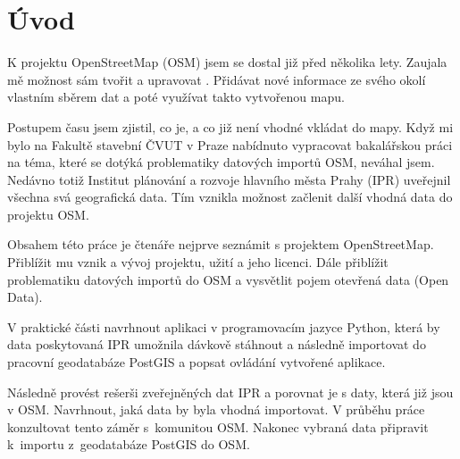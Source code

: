 \chapter{Úvod}
\label{1-uvod}

K projektu OpenStreetMap (OSM) jsem se dostal již před několika lety.
Zaujala mě možnost sám tvořit a upravovat .
Přidávat nové informace ze svého okolí vlastním sběrem dat
a poté využívat takto vytvořenou mapu.

Postupem času jsem zjistil, co je, a co již není vhodné vkládat do mapy.
Když mi bylo na Fakultě stavební ČVUT v Praze nabídnuto vypracovat
bakalářskou práci na téma, které se dotýká problematiky datových importů OSM,
neváhal jsem. Nedávno totiž Institut plánování a rozvoje hlavního města Prahy
(IPR) uveřejnil všechna svá geografická data.
Tím vznikla možnost začlenit další vhodná data do projektu OSM.

Obsahem této práce je čtenáře nejprve seznámit s projektem
OpenStreetMap. Přiblížit mu vznik a vývoj projektu, užití a jeho licenci.
Dále přiblížit problematiku datových importů do OSM a vysvětlit
pojem otevřená data (Open Data).

V praktické části navrhnout aplikaci v programovacím jazyce Python,
která by data poskytovaná IPR umožnila dávkově stáhnout a následně
importovat do pracovní geodatabáze PostGIS a popsat ovládání
vytvořené aplikace.

Následně provést rešerši zveřejněných dat IPR a porovnat je s daty,
která již jsou v OSM. Navrhnout, jaká data by byla vhodná importovat.
V průběhu práce konzultovat tento záměr s~komunitou OSM.
Nakonec vybraná data připravit k~importu z~geodatabáze PostGIS
do OSM.
